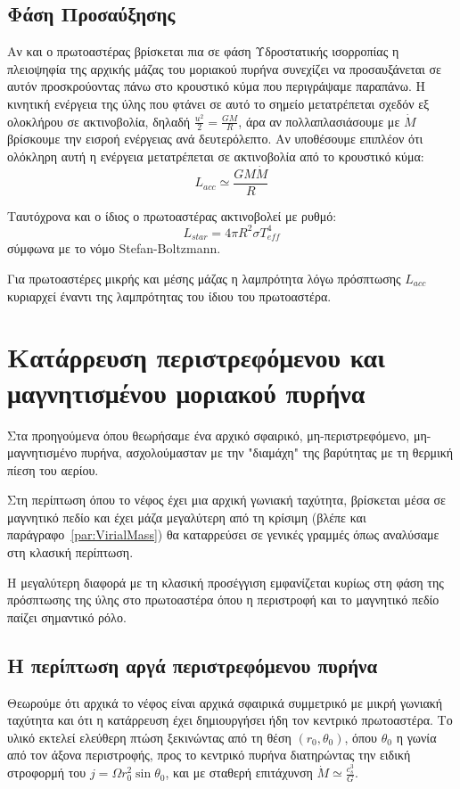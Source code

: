 \documentclass[a4paper,12pt]{memoir}
\begin{document}
\subsection{Φάση Προσαύξησης}
Αν και ο πρωτοαστέρας βρίσκεται πια σε φάση Υδροστατικής ισορροπίας η πλειοψηφία της αρχικής μάζας του μοριακού πυρήνα συνεχίζει να προσαυξάνεται σε αυτόν προσκρούοντας πάνω στο κρουστικό κύμα που περιγράψαμε παραπάνω. 
Η κινητική ενέργεια της ύλης που φτάνει σε αυτό το σημείο μετατρέπεται σχεδόν εξ ολοκλήρου σε ακτινοβολία, δηλαδή $\frac{u^2}{2}=\frac{GM}{R}$, άρα αν πολλαπλασιάσουμε με $\dot{M}$ βρίσκουμε την εισροή ενέργειας ανά δευτερόλεπτο. Αν υποθέσουμε επιπλέον ότι ολόκληρη αυτή η ενέργεια μετατρέπεται σε ακτινοβολία από το κρουστικό κύμα: 
\begin{equation}
L_{acc} \simeq \frac{GM\dot{M}}{R}
\end{equation}

Ταυτόχρονα και ο ίδιος ο πρωτοαστέρας ακτινοβολεί με ρυθμό:
\begin{equation}
L_{star}=4 \pi R^2 \sigma T_{eff} ^4
\end{equation}
σύμφωνα με το νόμο Stefan-Boltzmann.

Για πρωτοαστέρες μικρής και μέσης μάζας η λαμπρότητα λόγω πρόσπτωσης $L_{acc}$ κυριαρχεί έναντι της λαμπρότητας του ίδιου του πρωτοαστέρα.


\section{Κατάρρευση περιστρεφόμενου και μαγνητισμένου μοριακού πυρήνα}
Στα προηγούμενα όπου θεωρήσαμε ένα αρχικό σφαιρικό, μη-περιστρεφόμενο, μη-μαγνητισμένο πυρήνα, ασχολούμασταν με την "διαμάχη" της βαρύτητας με τη θερμική πίεση του αερίου. 

Στη περίπτωση όπου το νέφος έχει μια αρχική γωνιακή ταχύτητα, βρίσκεται μέσα σε μαγνητικό πεδίο και έχει μάζα μεγαλύτερη από τη κρίσιμη (βλέπε και παράγραφο~\ref{par:VirialMass}) θα καταρρεύσει σε γενικές γραμμές όπως αναλύσαμε στη κλασική περίπτωση.

Η μεγαλύτερη διαφορά με τη κλασική προσέγγιση εμφανίζεται κυρίως στη φάση της πρόσπτωσης της ύλης στο πρωτοαστέρα όπου η περιστροφή και το μαγνητικό πεδίο παίζει σημαντικό ρόλο.

\subsection{Η περίπτωση αργά περιστρεφόμενου πυρήνα}
Θεωρούμε ότι αρχικά το νέφος είναι αρχικά σφαιρικά συμμετρικό με μικρή γωνιακή ταχύτητα και ότι η κατάρρευση έχει δημιουργήσει ήδη τον κεντρικό πρωτοαστέρα.
Το υλικό εκτελεί ελεύθερη πτώση ξεκινώντας από τη θέση $(r_0,\theta _0)$, όπου $\theta _0$ η γωνία από τον άξονα περιστροφής, προς το κεντρικό πυρήνα διατηρώντας την ειδική στροφορμή του $j=\Omega r_0 ^2 \sin \theta_0$, και με σταθερή επιτάχυνση $\dot{M} \simeq \frac{c_s ^3}{G}$.   
\end{document}
